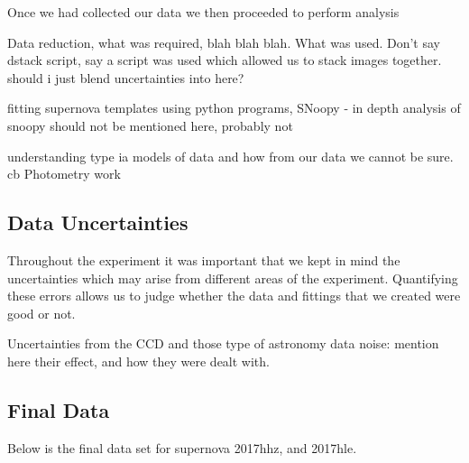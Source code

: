 \documentclass[twocolumn]{revtex4}
\begin{document}
Once we had collected our data we then proceeded to perform analysis

Data reduction, what was required, blah blah blah. What was used. Don't say dstack script, say a script was used which allowed us to stack images together. should i just blend uncertainties into here? 

fitting supernova templates using python programs, SNoopy - in depth analysis of snoopy should not be mentioned here, probably not

understanding type ia models of data and how from our data we cannot be sure.  
 cb
Photometry work 

\vspace{-3ex}
\subsection{Data Uncertainties}
\vspace{-2ex}

Throughout the experiment it was important that we kept in mind the uncertainties which may arise from different areas of the experiment. Quantifying these errors allows us to judge whether the data and fittings that we created were good or not. 

Uncertainties from the CCD and those type of astronomy data noise: mention here their effect, and how they were dealt with. 

\vspace{-3ex}
\subsection{Final Data}
\vspace{-2ex}

Below is the final data set for supernova 2017hhz, and 2017hle. 
\end{document}
